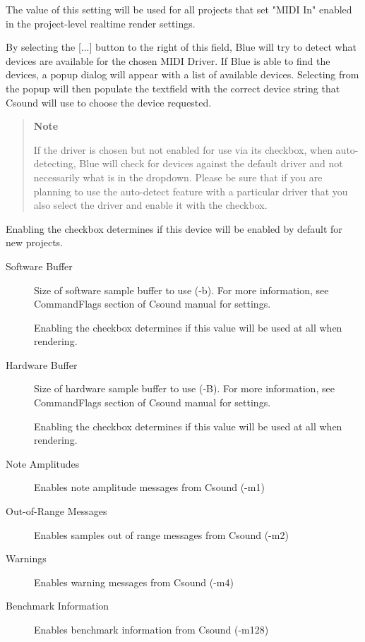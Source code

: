 \begin{description}
The value of this setting will be used for all projects that set "MIDI
In" enabled in the project-level realtime render settings.

By selecting the {[}...{]} button to the right of this field, Blue will
try to detect what devices are available for the chosen MIDI Driver. If
Blue is able to find the devices, a popup dialog will appear with a list
of available devices. Selecting from the popup will then populate the
textfield with the correct device string that Csound will use to choose
the device requested.

\begin{quote}
\textbf{Note}

If the driver is chosen but not enabled for use via its checkbox, when
auto-detecting, Blue will check for devices against the default driver
and not necessarily what is in the dropdown. Please be sure that if you
are planning to use the auto-detect feature with a particular driver
that you also select the driver and enable it with the checkbox.
\end{quote}

Enabling the checkbox determines if this device will be enabled by
default for new projects.
\end{description}

\begin{description}
\item[Software Buffer]
Size of software sample buffer to use (-b). For more information, see
CommandFlags section of Csound manual for settings.

Enabling the checkbox determines if this value will be used at all when
rendering.
\item[Hardware Buffer]
Size of hardware sample buffer to use (-B). For more information, see
CommandFlags section of Csound manual for settings.

Enabling the checkbox determines if this value will be used at all when
rendering.
\end{description}

\begin{description}
\item[Note Amplitudes]
Enables note amplitude messages from Csound (-m1)
\item[Out-of-Range Messages]
Enables samples out of range messages from Csound (-m2)
\item[Warnings]
Enables warning messages from Csound (-m4)
\item[Benchmark Information]
Enables benchmark information from Csound (-m128)
\end{description}

